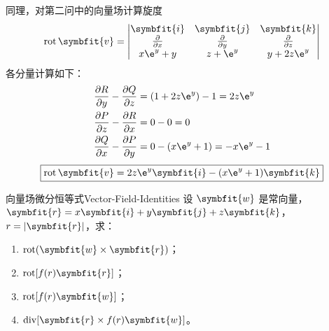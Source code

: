 \begin{solution}
    同理，对第二问中的向量场计算旋度
    \begin{equation} \label{eq:curl-def-2}
        \operatorname{rot} \symbfit{v} = \begin{vmatrix} \symbfit{i} & \symbfit{j} & \symbfit{k} \\ \frac{\partial}{\partial x} & \frac{\partial}{\partial y} & \frac{\partial}{\partial z} \\ x \e^y + y & z + \e^y & y + 2z \e^y \end{vmatrix}
    \end{equation}
    各分量计算如下：
    \begin{equation} \label{eq:curl-res-2}
        \begin{aligned}
            \frac{\partial R}{\partial y} - \frac{\partial Q}{\partial z} & = (1 + 2z \e^y) - 1 = 2z \e^y    \\
            \frac{\partial P}{\partial z} - \frac{\partial R}{\partial x} & = 0 - 0 = 0                      \\
            \frac{\partial Q}{\partial x} - \frac{\partial P}{\partial y} & = 0 - (x \e^y + 1) = -x \e^y - 1
        \end{aligned}
    \end{equation}
    \begin{equation}
        \boxed{\operatorname{rot} \symbfit{v} = 2z \e^y \symbfit{i} - (x \e^y + 1) \symbfit{k}}
    \end{equation}
\end{solution}


\begin{problem}{向量场微分恒等式}{Vector-Field-Identities}
    设 $\symbfit{w}$ 是常向量，$\symbfit{r} = x \symbfit{i} + y \symbfit{j} + z \symbfit{k}$，$r = |\symbfit{r}|$，求：
    \begin{enumerate}
        \item $\operatorname{rot} (\symbfit{w} \times \symbfit{r})$；
        \item $\operatorname{rot} [f(r) \symbfit{r}]$；
        \item $\operatorname{rot} [f(r) \symbfit{w}]$；
        \item $\operatorname{div} [\symbfit{r} \times f(r) \symbfit{w}]$。
    \end{enumerate}
\end{problem}


